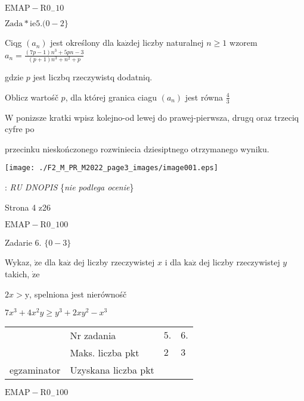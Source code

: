 \documentclass[a4paper,12pt]{article}
\begin{document}
$\mathrm{E}\mathrm{M}\mathrm{A}\mathrm{P}-\mathrm{R}0_{-}10$















$\mathrm{Z}\mathrm{a}\mathrm{d}\mathrm{a}*\mathrm{i}\mathrm{e}5. (0-2\}$

Ciqg $(a_{n})$ jest określony dla $\mathrm{k}\mathrm{a}\dot{\mathrm{z}}\mathrm{d}\mathrm{e}\mathrm{j}$ liczby naturalnej $n\geq 1$ wzorem $a_{n}=\displaystyle \frac{(7p-1)n^{3}+5pn-3}{(p+1)n^{3}+n^{2}+p}$

gdzie $p$ jest liczbq rzeczywistq dodatniq.

Oblicz wartośč $p$, dla której granica ciagu $(a_{n})$ jest równa $\displaystyle \frac{4}{3}$

W ponizsze kratki wpisz kolejno-od lewej do prawej-pierwsza, drugq oraz trzeciq cyfre po

przecinku nieskończonego rozwiniecia dziesiptnego otrzymanego wyniku.
\begin{center}
\texttt{[image: ./F2\_M\_PR\_M2022\_page3\_images/image001.eps]}
\end{center}
: {\it RU DNOPIS} \{{\it nie podlega ocenie}\}

Strona 4 z26

$\mathrm{E}\mathrm{M}\mathrm{A}\mathrm{P}-\mathrm{R}0_{-}100$





Zadarie 6. $\{0-3\}$

Wykaz, $\dot{\mathrm{z}}\mathrm{e}$ dla $\mathrm{k}\mathrm{a}\dot{\mathrm{z}}$ dej liczby rzeczywistej $x$ i dla $\mathrm{k}\mathrm{a}\dot{\mathrm{z}}$ dej liczby rzeczywistej $y$ takich, $\dot{\mathrm{z}}\mathrm{e}$

$2x>\mathrm{y}$, spelniona jest nierównośč

$7x^{3}+4x^{2}y\geq y^{3}+2xy^{2}-x^{3}$
\begin{center}
\begin{tabular}{|l|l|l|l|}
\cline{2-4}
&	\multicolumn{1}{|l|}{Nr zadania}&	\multicolumn{1}{|l|}{$5.$}&	\multicolumn{1}{|l|}{ $6.$}	\\
\cline{2-4}
&	\multicolumn{1}{|l|}{Maks. liczba pkt}&	\multicolumn{1}{|l|}{$2$}&	\multicolumn{1}{|l|}{ $3$}	\\
\cline{2-4}
\multicolumn{1}{|l|}{egzaminator}&	\multicolumn{1}{|l|}{Uzyskana liczba pkt}&	\multicolumn{1}{|l|}{}&	\multicolumn{1}{|l|}{}	\\
\hline
\end{tabular}

\end{center}
$\mathrm{E}\mathrm{M}\mathrm{A}\mathrm{P}-\mathrm{R}0_{-}100$
\end{document}
